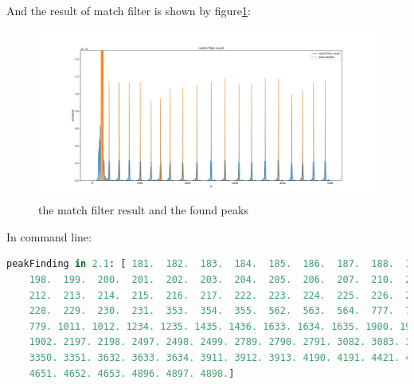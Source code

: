 \documentclass[a4paper,12pt]{article}
\begin{document}
And the result of match filter is shown by figure\ref{fig_matchResult}:
\begin{figure}[H]   
	\centering 
	\includegraphics[width=12cm]{../Figures/matchResult.pdf} 
	\caption{the match filter result and the found peaks} 
	\label{fig_matchResult}
\end{figure}
In command line:
\begin{lstlisting}[language=Python]
	peakFinding in 2.1: [ 181.  182.  183.  184.  185.  186.  187.  188.  189.  190.  191.  197.
	198.  199.  200.  201.  202.  203.  204.  205.  206.  207.  210.  211.
	212.  213.  214.  215.  216.  217.  222.  223.  224.  225.  226.  227.
	228.  229.  230.  231.  353.  354.  355.  562.  563.  564.  777.  778.
	779. 1011. 1012. 1234. 1235. 1435. 1436. 1633. 1634. 1635. 1900. 1901.
	1902. 2197. 2198. 2497. 2498. 2499. 2789. 2790. 2791. 3082. 3083. 3349.
	3350. 3351. 3632. 3633. 3634. 3911. 3912. 3913. 4190. 4191. 4421. 4422.
	4651. 4652. 4653. 4896. 4897. 4898.]
\end{lstlisting}
\end{document}
